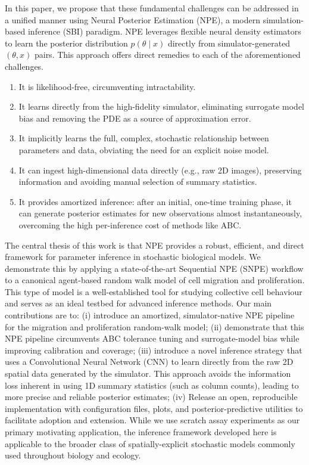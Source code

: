 \documentclass{article}
\begin{document}
In this paper, we propose that these fundamental challenges can be addressed in a unified manner using Neural Posterior Estimation (NPE), a modern simulation-based inference (SBI) paradigm. NPE leverages flexible neural density estimators to learn the posterior distribution $p\left(\theta \mid x\right)$ directly from simulator-generated $(\theta,x)$ pairs. This approach offers direct remedies to each of the aforementioned challenges. 
\begin{enumerate} 
	\item It is likelihood-free, circumventing intractability.
	 \item It learns directly from the high-fidelity simulator, eliminating surrogate model bias and removing the PDE as a source of approximation error. 
	 \item It implicitly learns the full, complex, stochastic relationship between parameters and data, obviating the need for an explicit noise model. 
	 \item It can ingest high-dimensional data directly (e.g., raw 2D images), preserving information and avoiding manual selection of summary statistics.
	 \item It provides amortized inference: after an initial, one-time training phase, it can generate posterior estimates for new observations almost instantaneously, overcoming the high per-inference cost of methods like ABC. 
	 \end{enumerate}
The central thesis of this work is that NPE provides a robust, efficient, and direct framework for parameter inference in stochastic biological models. We demonstrate this by applying a state-of-the-art Sequential NPE (SNPE) workflow to a canonical agent-based random walk model of cell migration and proliferation. This type of model is a well-established tool for studying collective cell behaviour \citep[see e.g.][]{Simpson2025.05.25.656057} and serves as an ideal testbed for advanced inference methods. Our main contributions are to: (i) introduce an amortized, simulator-native NPE pipeline for the migration and proliferation random-walk model; (ii) demonstrate that this NPE pipeline circumvents ABC tolerance tuning and surrogate-model bias while improving calibration and coverage; (iii) introduce a novel inference strategy that uses a Convolutional Neural Network (CNN) to learn directly from the raw 2D spatial data generated by the simulator. This approach avoids the information loss inherent in using 1D summary statistics (such as column counts), leading to more precise and reliable posterior estimates; (iv) Release an open, reproducible implementation with configuration files, plots, and posterior-predictive utilities to facilitate adoption and extension. While we use scratch assay experiments as our primary motivating application, the inference framework developed here is applicable to the broader class of spatially-explicit stochastic models commonly used throughout biology and ecology.
\end{document}
